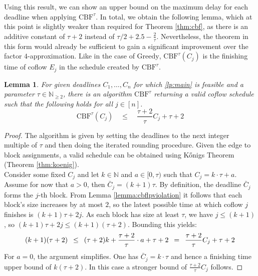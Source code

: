 \documentclass[11pt]{article}
\newcommand{\Hquad}{\hspace{0.5em}}
\newtheorem{lemma}[theorem]{Lemma}
\begin{document}
\noindent Using this result, we can show an upper bound on the maximum delay for each deadline when applying $\mathrm{CBF}^\tau$. In total, we obtain the following lemma, which at this point is slightly weaker than required for Theorem \ref{thm:cbf}, as there is an additive constant of $\tau+2$ instead of $\tau/2 + 2.5 - \frac{2}{\tau}$. Nevertheless, the theorem in this form would already be sufficient to gain a significant improvement over the factor $4$-approximation. Like in the case of $\mathrm{Greedy}$, $\mathrm{CBF}^\tau(C_j)$ is the finishing time of coflow $E_j$ in the schedule created by $\mathrm{CBF}^\tau$. 
\begin{lemma}\label{lemma:cbfweak}
For given deadlines $C_1,\dotsc,C_n$ for which \ref{lp:main} is feasible and a parameter $\tau \in \mathbb{N}_{\ge 2}$, there is an algorithm $\mathrm{CBF}^\tau$ returning a valid coflow schedule such that the following holds for all $j \in [n]$.
\begin{equation*}
    \mathrm{CBF}^\tau(C_j) \quad \le \quad \frac{\tau+2}{\tau}C_j + \tau + 2
\end{equation*}
\end{lemma}
\begin{proof}
The algorithm is given by setting the deadlines to the next integer multiple of $\tau$ and then doing the iterated rounding procedure. Given the edge to block assignments, a valid schedule can be obtained using Kőnigs Theorem (Theorem \ref{thm:koenig}).\\
Consider some fixed $C_j$ and let $k \in \mathbb{N}$ and $a \in [0,\tau)$ such that $C_j = k \cdot \tau + a$. Assume for now that $a > 0$, then $\bar{C}_j = (k+1) \tau$. By definition, the deadline $\bar{C}_j$ forms the $j$-th block. From Lemma \ref{lemma:cbflpviolation} it follows that each block's size increases by at most $2$, so the latest possible time at which coflow $j$ finishes is $(k+1) \tau + 2j$. As each block has size at least $\tau$, we have $j \le (k+1)$, so $(k+1)\tau + 2j \le (k+1)(\tau+2)$. Bounding this yields:
\begin{equation*}
    (k+1)(\tau+2) \Hquad\le\Hquad (\tau+2)k + \frac{\tau+2}{\tau}\cdot a + \tau + 2 \Hquad=\Hquad \frac{\tau+2}{\tau}C_j + \tau + 2
\end{equation*}
For $a = 0$, the argument simplifies. One has $\bar{C}_j = k\cdot\tau$ and hence a finishing time upper bound of $k(\tau+2)$. In this case a stronger bound of $\frac{\tau+2}{\tau}C_j$ follows.
\end{proof}
\end{document}
